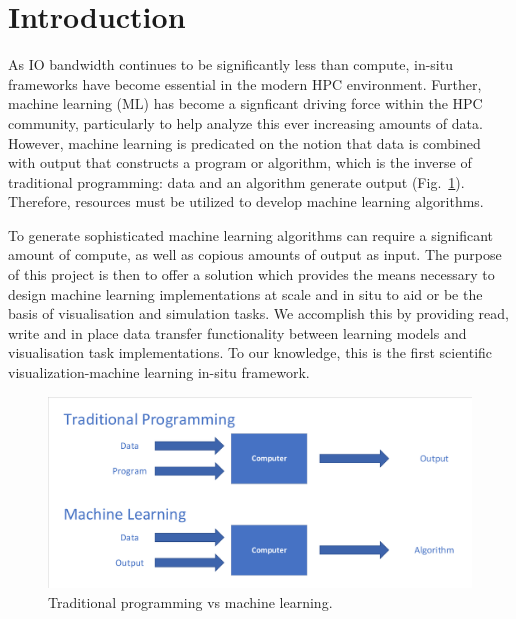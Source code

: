 \section{Introduction}
As IO bandwidth continues to be significantly less than compute, in-situ frameworks have become essential in the modern HPC environment. Further, machine learning (ML) has become a signficant driving force within the HPC community, particularly to help analyze this ever increasing amounts of data. However, machine learning is predicated on the notion that data is combined with output that constructs a program or algorithm, which is the inverse of traditional programming: data and an algorithm generate output (Fig.~\ref{fig:ml-vs-trad}). Therefore, resources must be utilized to develop machine learning algorithms. 

To generate sophisticated machine learning algorithms can require a significant amount of compute, as well as copious amounts of output as input. The purpose of this project is then to offer a solution which provides the means necessary to design machine learning implementations at scale and in situ to aid or be the basis of visualisation and simulation tasks. We accomplish this by providing read, write and in place data transfer functionality between learning models and visualisation task implementations. To our knowledge, this is the first scientific visualization-machine learning in-situ framework.

\begin{figure}
    \includegraphics[width=\linewidth]{ML-data-output-program}
    \caption{Traditional programming vs machine learning.}
    \label{fig:ml-vs-trad}
  \end{figure}

